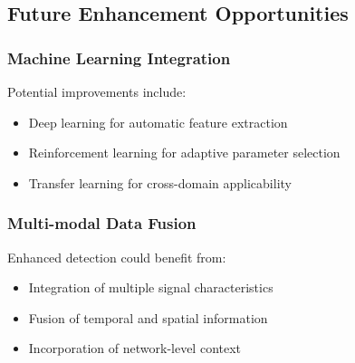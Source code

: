 \subsection{Future Enhancement Opportunities}

\subsubsection{Machine Learning Integration}
Potential improvements include:
\begin{itemize}
\item Deep learning for automatic feature extraction
\item Reinforcement learning for adaptive parameter selection
\item Transfer learning for cross-domain applicability
\end{itemize}

\subsubsection{Multi-modal Data Fusion}
Enhanced detection could benefit from:
\begin{itemize}
\item Integration of multiple signal characteristics
\item Fusion of temporal and spatial information
\item Incorporation of network-level context
\end{itemize}

